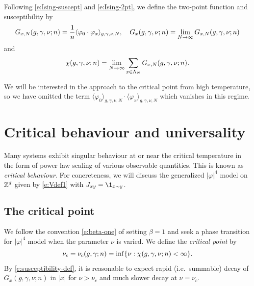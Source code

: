 Following \eqref{e:Ising-suscept} and \eqref{e:Ising-2pt}, we define the
two-point function and susceptibility by
\begin{equation}
\label{e:two-point-function-phi4}
G_{x, N}(g,\gamma,\nu; n)
	=
\frac{1}{n} \langle \varphi_0 \cdot \varphi_x \rangle_{g,\gamma,\nu,N},
	\quad
G_x(g,\gamma,\nu; n)
	=
\lim_{N \rightarrow \infty} G_{x, N}(g,\gamma,\nu; n)
\end{equation}
and
\begin{equation}
\label{e:susceptibility-def}
\chi(g, \gamma, \nu; n)
	=
\lim_{N\rightarrow\infty} \sum_{x\in\Lambda_N} G_{x,N}(g, \gamma, \nu; n).
\end{equation}

\begin{rk}
We will be interested in the approach to the critical point from high temperature,
so we have omitted the term
$\langle \varphi_0 \rangle_{g,\gamma,\nu,N} \cdot \langle \varphi_x \rangle_{g,\gamma,\nu,N}$
which vanishes in this regime.
\end{rk}


\section{Critical behaviour and universality}
\label{sec:crit}

Many systems exhibit singular behaviour at or near the critical temperature in
the form of power law scaling of various observable quantities. This is known as
\emph{critical behaviour}. For concreteness, we will discuss the generalized
$|\varphi|^4$ model on ${ {{\mathbb Z}}^d }$ given by \eqref{e:Vdef1}
with $J_{xy} = \1_{x\sim y}$.


\subsection{The critical point}

We follow the convention \eqref{e:beta-one} of setting $\beta = 1$ and seek a
phase transition for $|\varphi|^4$ model when the parameter $\nu$ is varied.
We define the \emph{critical point} by
\begin{equation}
\nu_c = \nu_c(g, \gamma; n) = \inf \{ \nu : \chi(g, \gamma, \nu; n) < \infty \}.
\end{equation}
By \eqref{e:susceptibility-def}, it is
reasonable to expect rapid (i.e.\ summable) decay of $G_x(g, \gamma, \nu; n)$ in $|x|$ for
$\nu > \nu_c$ and much slower decay at $\nu = \nu_c$.

